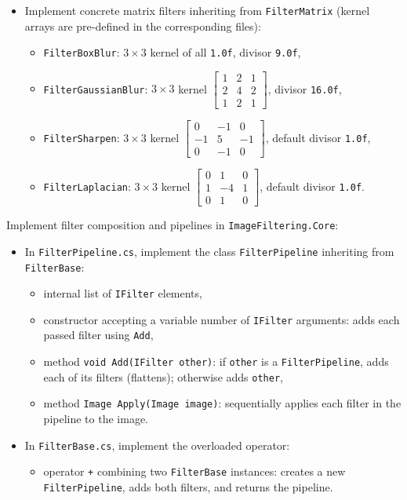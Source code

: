\documentclass[11pt,a4paper,addpoints]{exam}
\begin{document}
\begin{questions}
\begin{itemize}
    \item Implement concrete matrix filters inheriting from \texttt{FilterMatrix} (kernel arrays are pre-defined in the corresponding files):
    \begin{itemize}
        \item \texttt{FilterBoxBlur}: $3 \times 3$ kernel of all \texttt{1.0f}, divisor \texttt{9.0f},
        \item \texttt{FilterGaussianBlur}: $3 \times 3$ kernel $\begin{bmatrix} 1 & 2 & 1 \\ 2 & 4 & 2 \\ 1 & 2 & 1 \end{bmatrix}$, divisor \texttt{16.0f},
        \item \texttt{FilterSharpen}: $3 \times 3$ kernel $\begin{bmatrix} 0 & -1 & 0 \\ -1 & 5 & -1 \\ 0 & -1 & 0 \end{bmatrix}$, default divisor \texttt{1.0f},
        \item \texttt{FilterLaplacian}: $3 \times 3$ kernel $\begin{bmatrix} 0 & 1 & 0 \\ 1 & -4 & 1 \\ 0 & 1 & 0 \end{bmatrix}$, default divisor \texttt{1.0f}.
    \end{itemize}
\end{itemize}

\question[2]
Implement filter composition and pipelines in \texttt{ImageFiltering.Core}:
\begin{itemize}
    \item In \texttt{FilterPipeline.cs}, implement the class \texttt{FilterPipeline} inheriting from \texttt{FilterBase}:
    \begin{itemize}
        \item internal list of \texttt{IFilter} elements,
        \item constructor accepting a variable number of \texttt{IFilter} arguments: adds each passed filter using \texttt{Add},
        \item method \texttt{void Add(IFilter other)}: if \texttt{other} is a \texttt{FilterPipeline}, adds each of its filters (flattens); otherwise adds \texttt{other},
        \item method \texttt{Image Apply(Image image)}: sequentially applies each filter in the pipeline to the image.
    \end{itemize}

    \item In \texttt{FilterBase.cs}, implement the overloaded operator:
    \begin{itemize}
        \item operator \texttt{+} combining two \texttt{FilterBase} instances: creates a new \texttt{FilterPipeline}, adds both filters, and returns the pipeline.
    \end{itemize}
\end{itemize}

\end{questions}
\end{document}

